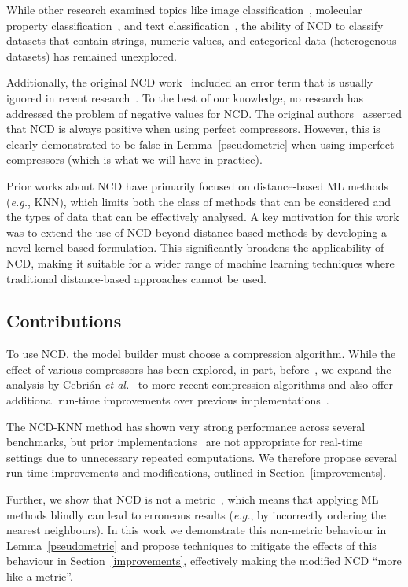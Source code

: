 \documentclass[preprint,12pt]{article}
\begin{document}
While other research examined topics like image classification~\cite{opitz2023gzip}, molecular property classification~\cite{weinreich2023parameter}, and text classification~\cite{nishida2011tweet}, the ability of NCD to classify datasets that contain strings, numeric values, and categorical data (heterogenous datasets) has remained unexplored.

Additionally, the original NCD work~\cite{ncd} included an error term that is usually ignored in recent research~\cite{opitz2023gzip,weinreich2023parameter,nishida2011tweet,jiang2022less}.
To the best of our knowledge, no research has addressed the problem of negative values for NCD\@.
The original authors~\cite{ncd} asserted that NCD is always positive when using perfect compressors.
However, this is clearly demonstrated to be false in Lemma~\ref{pseudometric} when using imperfect compressors (which is what we will have in practice).

Prior works about NCD have primarily focused on distance-based ML methods (\textit{e.g.}, KNN), which limits both the class of methods that can be considered and the types of data that can be effectively analysed.
A key motivation for this work was to extend the use of NCD beyond distance-based methods by developing a novel kernel-based formulation. This significantly broadens the applicability of NCD, making it suitable for a wider range of machine learning techniques where traditional distance-based approaches cannot be used.



\subsection{Contributions}

To use NCD, the model builder must choose a compression algorithm.
While the effect of various compressors has been explored, in part, before~\cite{ncd_pitfalls}, we expand the analysis by Cebri\'{a}n \textit{et al.}~\cite{ncd_pitfalls} to more recent compression algorithms and also offer additional run-time improvements over previous implementations~\cite{jiang2022less}.

The NCD-KNN method has shown very strong performance across several benchmarks, but prior implementations~\cite{jiang2022less} are not appropriate for real-time settings due to unnecessary repeated computations.
We therefore propose several run-time improvements and modifications, outlined in Section~\ref{improvements}.

Further, we show that NCD is not a metric~\cite{opitz2023gzip,weinreich2023parameter,nishida2011tweet,jiang2022less}, which means that applying ML methods blindly can lead to erroneous results (\textit{e.g.}, by incorrectly ordering the nearest neighbours).
In this work we demonstrate this non-metric behaviour in Lemma~\ref{pseudometric} and propose techniques to mitigate the effects of this behaviour in Section~\ref{improvements}, effectively making the modified NCD ``more like a metric''.
\end{document}
